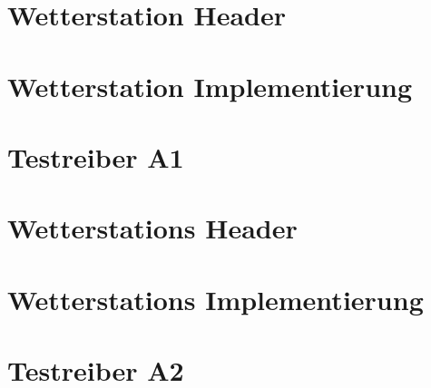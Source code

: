 \documentclass[10pt,a4paper, parskip=half]{scrartcl}
\begin{document}
\newpage
\appendix

\section{Wetterstation Header}\label{sec:WeatherStationHeader}


\section{Wetterstation Implementierung}\label{sec:WeatherStationCpp}


\section{Testreiber A1}\label{sec:TestTreiberA1}


\newpage
\section{Wetterstations Header}\label{sec:WeatherManagerHeader}


\section{Wetterstations Implementierung}\label{sec:WeatherManagerCpp}


\section{Testreiber A2}\label{sec:TestTreiberA2}

\end{document}
